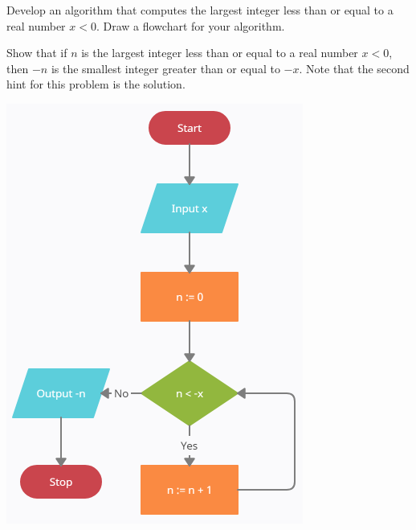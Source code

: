 \documentclass{ximera}
\begin{document}
\begin{question}
	Develop an algorithm that computes the largest integer less than or equal to a real number $x<0$. Draw a flowchart for your algorithm.
	\begin{hint}
		Show that if $n$ is the largest integer less than or equal to a real number $x<0$, then $-n$ is the smallest integer greater than or equal to $-x$. Note that the second hint for this problem is the solution.
	\end{hint}
	\begin{hint}
		\begin{center}
			\includegraphics{floorneg.png}
		\end{center}
	\end{hint}
\end{question}
\end{document}
